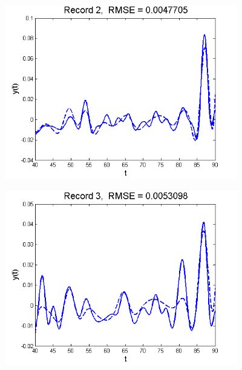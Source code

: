 \documentclass[11pt]{beamer}
\begin{document}
\begin{frame}

\begin{center}
\includegraphics[width=4in]{figs/SelTIC_fit2.png}
\end{center}

\end{frame}


\begin{frame}

\begin{center}
\includegraphics[width=4in]{figs/SelTIC_fit3.png}
\end{center}

\end{frame}

\end{document}
